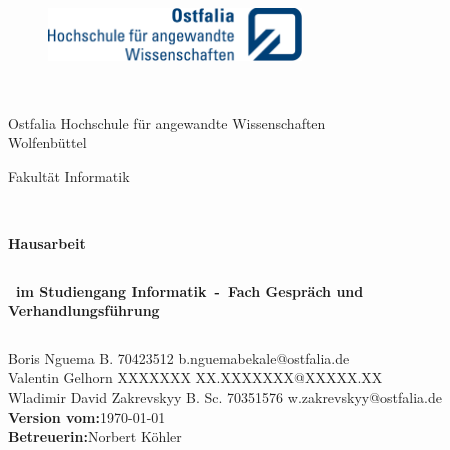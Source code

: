 \thispagestyle{empty}
\begin{figure}[t]
 \centering
 \includegraphics[width=0.6\textwidth]{abb/ostfaliaLogo}
\end{figure}

\begin{verbatim}


\end{verbatim}

\begin{center}
\Large{Ostfalia Hochschule für angewandte Wissenschaften}\\
\Large{Wolfenbüttel}\\
\end{center}

\begin{center}
\Large{Fakultät Informatik}
\end{center}

\begin{verbatim}


\end{verbatim}

\begin{center}
\doublespacing
\textbf{\LARGE{Hausarbeit}}\\
\singlespacing
\begin{verbatim}

\end{verbatim}
\textbf{{~im Studiengang Informatik~-~Fach Gespräch und Verhandlungsführung~}}

\end{center}
\begin{verbatim}

\end{verbatim}

\begin{center}
Boris Nguema B. 70423512 b.nguemabekale@ostfalia.de\\
Valentin Gelhorn XXXXXXX  XX.XXXXXXX@XXXXX.XX\\
Wladimir David Zakrevskyy B. Sc. 70351576 w.zakrevskyy@ostfalia.de\\
\textbf{Version vom:}\today\\
\textbf{Betreuerin:}Norbert Köhler\\
\end{center}